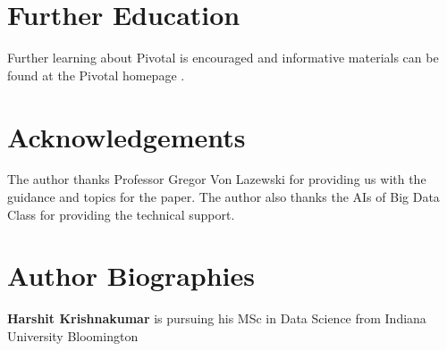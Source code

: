 \documentclass[9pt,twocolumn,twoside]{../../styles/osajnl}
\begin{document}
\section{Further Education}
Further learning about Pivotal is encouraged and informative materials can be found at the Pivotal homepage \cite{www-pws-agile}.

\section*{Acknowledgements}

The author thanks Professor Gregor Von Lazewski for providing us with the guidance and topics for the paper. The author also thanks the AIs of Big Data Class for providing the technical support.




 
\section*{Author Biographies}
\begingroup
\setlength\intextsep{0pt}
\begin{minipage}[t][3.2cm][t]{1.0\columnwidth} %
{\bfseries Harshit Krishnakumar} is pursuing his MSc in Data Science from
Indiana University Bloomington
\end{minipage}
\endgroup
\end{document}
